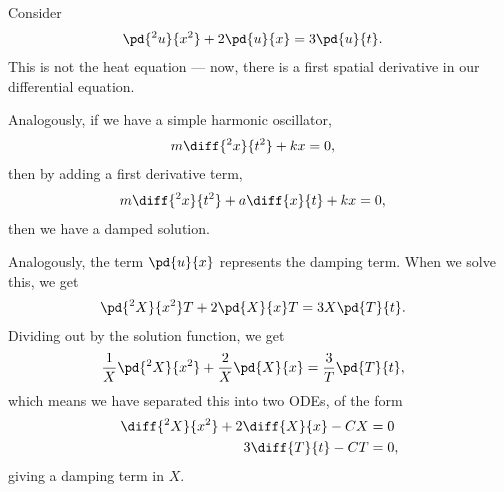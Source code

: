 \documentclass[10pt]{mypackage}
\begin{document}
\begin{example}
  Consider
  \begin{align*}
    \pd{^2u}{x^2} + 2 \pd{u}{x} &= 3 \pd{u}{t}.
  \end{align*}
  This is not the heat equation --- now, there is a first spatial derivative in our differential equation.\newline

  Analogously, if we have a simple harmonic oscillator,
  \begin{align*}
    m\diff{^2x}{t^2} + kx &= 0,
  \end{align*}
  then by adding a first derivative term,
  \begin{align*}
    m \diff{^2x}{t^2} + a \diff{x}{t} + kx &= 0,
  \end{align*}
  then we have a damped solution.\newline

  Analogously, the term $\pd{u}{x}$ represents the damping term. When we solve this, we get
  \begin{align*}
    \pd{^2X}{x^2}T + 2 \pd{X}{x}T &= 3X \pd{T}{t}.
  \end{align*}
  Dividing out by the solution function, we get
  \begin{align*}
    \frac{1}{X} \pd{^2X}{x^2} + \frac{2}{X} \pd{X}{x} &= \frac{3}{T} \pd{T}{t},
  \end{align*}
  which means we have separated this into two ODEs, of the form
  \begin{align*}
    \diff{^2X}{x^2} + 2\diff{X}{x} - CX &= 0\\
    3 \diff{T}{t} - CT &= 0,
  \end{align*}
  giving a damping term in $X$.
\end{example}
\end{document}
